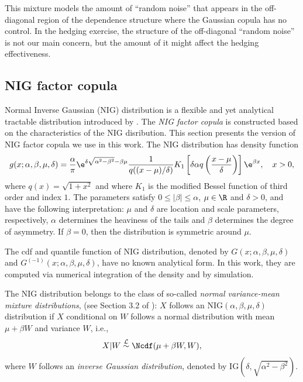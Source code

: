 \documentclass[11pt,a4paper,english]{article}
\begin{document}
This mixture models the amount of ``random noise'' that appears in the
off-diagonal region of the dependence structure where the Gaussian copula has no control.
In the hedging exercise, the structure of the off-diagonal ``random noise'' is not our main concern, 
but the amount of it might affect the hedging effectiveness.

\subsection{NIG factor copula}

Normal Inverse Gaussian (NIG) distribution is a flexible and yet analytical tractable distribution introduced by
\citep{BarndorffNielsen1997}.
The {\em NIG factor copula} is constructed based on the characteristics of the NIG disribution. 
This section presents the version of NIG factor copula we use in this work.
The NIG distribution has density function
\begin{equation*}
  g(x; \alpha,\beta, \mu, \delta) = \frac{\alpha}{\pi} \e^{\delta
    \sqrt{\alpha^2-\beta^2} -\beta\mu} \frac{1}{q((x-\mu)/\delta)}
  K_1\left[\delta \alpha q\left(\frac{x-\mu}{\delta}\right) \right]
  \e^{\beta x},\quad x>0,
\end{equation*}
where $q(x) = \sqrt{1+x^2}$ and where $K_1$ is the modified Bessel
function of third order and index $1$. The parameters satisfy $0\leq
|\beta|\leq \alpha$, $\mu\in \R$ and $\delta>0$, and have
the following interpretation: $\mu$ and $\delta$ are location and
scale parameters, respectively, $\alpha$ determines the heaviness of
the tails and $\beta$ determines the degree of asymmetry. If
$\beta=0$, then the distribution is symmetric around $\mu$.

The cdf and quantile function of NIG distribution, denoted by $G(x; \alpha, \beta, \mu, \delta)$ and $G^{(-1)}(x; \alpha, \beta, \mu, \delta)$,
 have no known analytical form.
 In this work, they are computed via numerical integration of the density and by simulation.

The NIG distribution belongs to
the class of so-called {\em normal
variance-mean mixture distributions},  (see Section 3.2 of 
\citet{McNeil2005}): $X$ follows an
$\text{NIG}(\alpha,\beta,\mu,\delta)$ distribution if $X$ conditional
on $W$ follows a normal distribution with mean $\mu+\beta W$ and
variance $W$, i.e., 
\begin{equation*}
  X|W\stackrel{\mathcal L}\sim \Ncdf(\mu + \beta W, W),
\end{equation*}
where $W$ follows an {\em inverse Gaussian distribution}, denoted by
$\text{IG}(\delta, \sqrt{\alpha^2-\beta^2})$.
\end{document}
